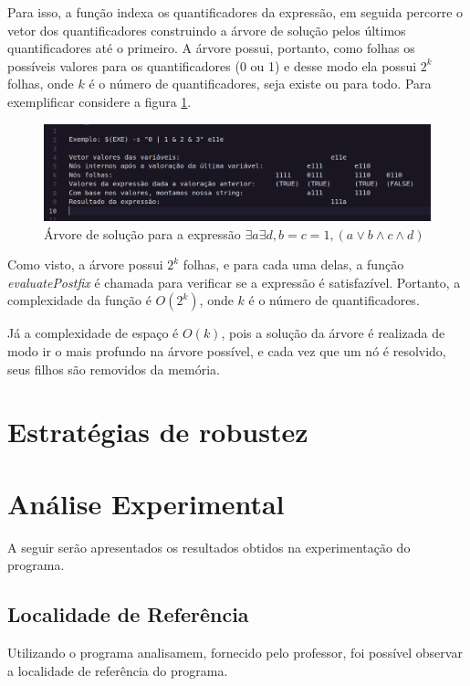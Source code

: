 \documentclass{article}
\begin{document}
Para isso, a função indexa os quantificadores da expressão, em seguida percorre o vetor dos quantificadores construindo a árvore de solução pelos últimos quantificadores até o primeiro.
A árvore possui, portanto, como folhas os possíveis valores para os quantificadores (0 ou 1) e desse modo ela possui $2^k$ folhas, onde $k$ é o número de quantificadores, seja existe ou para todo. Para exemplificar considere a figura \ref{fig:sat_tree}.

\begin{figure}[H]
    \centering
    \includegraphics[width=\textwidth]{./sat_tree.png}
    \caption{Árvore de solução para a expressão $\exists a \exists d , b = c = 1,  (a \lor b \land c \land d)$}
    \label{fig:sat_tree}
\end{figure}

Como visto, a árvore possui $2^k$ folhas, e para cada uma delas, a função \textit{evaluatePostfix} é chamada para verificar se a expressão é satisfazível. Portanto, a complexidade da função é $O(2^k)$, onde $k$ é o número de quantificadores.

Já a complexidade de espaço é $O(k)$, pois a solução da árvore é realizada de modo ir o mais profundo na árvore possível, e cada vez que um nó é resolvido, seus filhos são removidos da memória.
\section{Estratégias de robustez}

\section{Análise Experimental}

A seguir serão apresentados os resultados obtidos na experimentação do programa.

\subsection{Localidade de Referência}

Utilizando o programa analisamem, fornecido pelo professor, foi possível observar a localidade de referência do programa.
\end{document}
